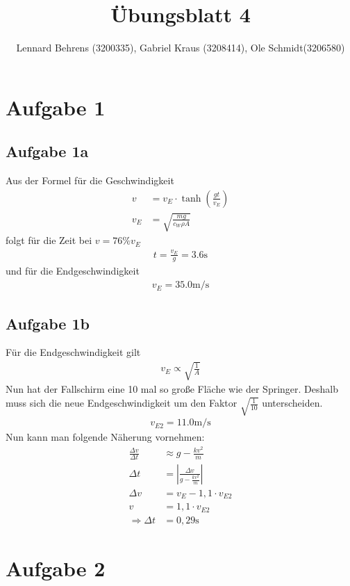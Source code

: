\documentclass[a4paper,10pt]{extarticle}
\title{Übungsblatt 4}
\author{Lennard Behrens (3200335), Gabriel Kraus (3208414), Ole Schmidt(3206580)}
\begin{document}
\maketitle

\section*{Aufgabe 1}
\subsection*{Aufgabe 1a}
Aus der Formel für die Geschwindigkeit
\begin{align*}
  v   &= v_E \cdot\tanh\left(\frac{gt}{v_E}\right)\\
  v_E &= \sqrt{\frac{mg}{c_W\rho A}}
\end{align*}
folgt für die Zeit bei $v=76\%v_E$
\begin{align*}
  t = \frac{v_E}{g} = 3.6\mbox{s}
\end{align*}
und für die Endgeschwindigkeit
\begin{align*}
  v_E = 35.0 \mbox{m/s}
\end{align*}
\subsection*{Aufgabe 1b}
Für die Endgeschwindigkeit gilt
\begin{align*}
  v_E \propto \sqrt{\frac{1}{A}}
\end{align*}
Nun hat der Fallschirm eine 10 mal so große Fläche wie der Springer. Deshalb muss sich die neue Endgeschwindigkeit um den Faktor $\sqrt{\frac{1}{10}}$ unterscheiden.
\begin{align*}
  v_{E2} = 11.0 \mbox{m/s}
\end{align*} 
Nun kann man folgende Näherung vornehmen:
\begin{align*}
  \frac{\Delta v}{\Delta t} &\approx g - \frac{kv^2}{m}\\
  \Delta t &= \left|\frac{\Delta v}{g-\frac{kv^2}{m}}\right|\\
  \Delta v &= v_{E}-1,1\cdot v_{E2}\\
  v &= 1,1\cdot v_{E2}\\
  \Rightarrow \Delta t &= 0,29 \mbox{s}
\end{align*}


\section*{Aufgabe 2}
\end{document}
